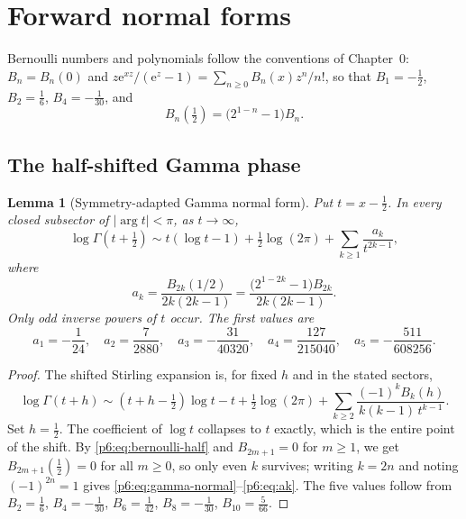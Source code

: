 \documentclass[11pt,a4paper,oneside]{book}
\theoremstyle{plain}
\newtheorem{lemma}[theorem]{Lemma}
\theoremstyle{definition}
\theoremstyle{remark}
\newcommand{\e}{\mathrm{e}}
\begin{document}
\section{Forward normal forms}
\label{p6:sec:forward}

Bernoulli numbers and polynomials follow the conventions of Chapter~0:
$B_n=B_n(0)$ and $z\e^{xz}/(\e^{z}-1)=\sum_{n\ge0}B_n(x)z^n/n!$, so that
$B_1=-\tfrac12$, $B_2=\tfrac16$, $B_4=-\tfrac1{30}$, and
\begin{equation}\label{p6:eq:bernoulli-half}
 B_n\!\left(\tfrac12\right)=\bigl(2^{1-n}-1\bigr)B_n .
\end{equation}

\subsection{The half-shifted Gamma phase}

\begin{lemma}[Symmetry-adapted Gamma normal form]
\label{p6:lem:gamma-normal-form}
Put $t=x-\tfrac12$.  In every closed subsector of $|\arg t|<\pi$, as
$t\to\infty$,
\begin{equation}\label{p6:eq:gamma-normal}
 \log\Gamma\!\left(t+\tfrac12\right)
 \sim t(\log t-1)+\tfrac12\log(2\pi)
 +\sum_{k\ge1}\frac{a_k}{t^{2k-1}},
\end{equation}
where
\begin{equation}\label{p6:eq:ak}
 a_k=\frac{B_{2k}(1/2)}{2k(2k-1)}
    =\frac{\bigl(2^{1-2k}-1\bigr)B_{2k}}{2k(2k-1)} .
\end{equation}
Only odd inverse powers of $t$ occur.  The first values are
\begin{equation}\label{p6:eq:ak-values}
 a_1=-\frac1{24},\quad
 a_2=\frac7{2880},\quad
 a_3=-\frac{31}{40320},\quad
 a_4=\frac{127}{215040},\quad
 a_5=-\frac{511}{608256}.
\end{equation}
\end{lemma}

\begin{proof}
The shifted Stirling expansion is, for fixed $h$ and in the stated sectors,
\begin{equation}\label{p6:eq:shifted-stirling}
 \log\Gamma(t+h)
 \sim\left(t+h-\tfrac12\right)\log t-t+\tfrac12\log(2\pi)
 +\sum_{k\ge2}\frac{(-1)^kB_k(h)}{k(k-1)\,t^{k-1}} .
\end{equation}
Set $h=\tfrac12$.  The coefficient of $\log t$ collapses to $t$ exactly, which
is the entire point of the shift.  By \eqref{p6:eq:bernoulli-half} and
$B_{2m+1}=0$ for $m\ge1$, we get $B_{2m+1}(\tfrac12)=0$ for all $m\ge0$, so
only even $k$ survives; writing $k=2n$ and noting $(-1)^{2n}=1$ gives
\eqref{p6:eq:gamma-normal}--\eqref{p6:eq:ak}.  The five values follow from
$B_2=\tfrac16$, $B_4=-\tfrac1{30}$, $B_6=\tfrac1{42}$, $B_8=-\tfrac1{30}$,
$B_{10}=\tfrac5{66}$.
\end{proof}
\end{document}
